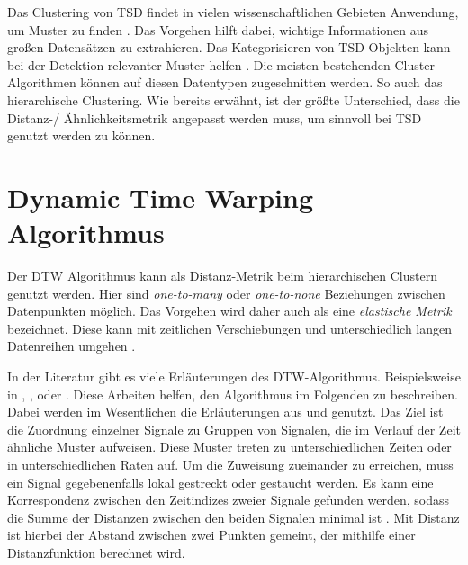 Das Clustering von \ac{TSD} findet in vielen wissenschaftlichen Gebieten Anwendung, um Muster zu finden \citep{aghabozorgi_time-series_2015}.
Das Vorgehen hilft dabei, wichtige Informationen aus großen Datensätzen zu extrahieren.
Das Kategorisieren von \ac{TSD}-Objekten kann bei der Detektion relevanter Muster helfen \citep{aghabozorgi_time-series_2015}.
Die meisten bestehenden Cluster-Algorithmen können auf diesen Datentypen zugeschnitten werden.
So auch das hierarchische Clustering.
Wie bereits erwähnt, ist der größte Unterschied, dass die Distanz-/ Ähnlichkeitsmetrik angepasst werden muss,
um sinnvoll bei \ac{TSD} genutzt werden zu können.

\section{Dynamic Time Warping Algorithmus}
\label{3-DTW}
Der \ac{DTW} Algorithmus kann als Distanz-Metrik beim hierarchischen Clustern genutzt werden.
Hier sind \emph{one-to-many} oder \emph{one-to-none} Beziehungen zwischen Datenpunkten möglich.
Das Vorgehen wird daher auch als eine \emph{elastische Metrik} bezeichnet.
Diese kann mit zeitlichen Verschiebungen und unterschiedlich langen Datenreihen umgehen \citep{aghabozorgi_time-series_2015}.

In der Literatur gibt es viele Erläuterungen des \ac{DTW}-Algorithmus.
Beispielsweise in \citet{mohammadzade_dynamic_2021}, \citet{warren_liao_clustering_2005},
\citet{aghabozorgi_time-series_2015} oder \citet{yu_dynamic_2019}.
Diese Arbeiten helfen, den Algorithmus im Folgenden zu beschreiben.
Dabei werden im Wesentlichen die Erläuterungen aus \citet{mohammadzade_dynamic_2021} und \citet{warren_liao_clustering_2005} genutzt.
Das Ziel ist die Zuordnung einzelner Signale zu Gruppen von Signalen,
die im Verlauf der Zeit ähnliche Muster aufweisen.
Diese Muster treten zu unterschiedlichen Zeiten oder in unterschiedlichen Raten auf.
Um die Zuweisung zueinander zu erreichen, muss ein Signal gegebenenfalls lokal gestreckt oder gestaucht werden.
Es kann eine Korrespondenz zwischen den Zeitindizes zweier Signale gefunden werden,
sodass die Summe der Distanzen zwischen den beiden Signalen minimal ist \citep{mohammadzade_dynamic_2021}.
Mit Distanz ist hierbei der Abstand zwischen zwei Punkten gemeint,
der mithilfe einer Distanzfunktion berechnet wird.

